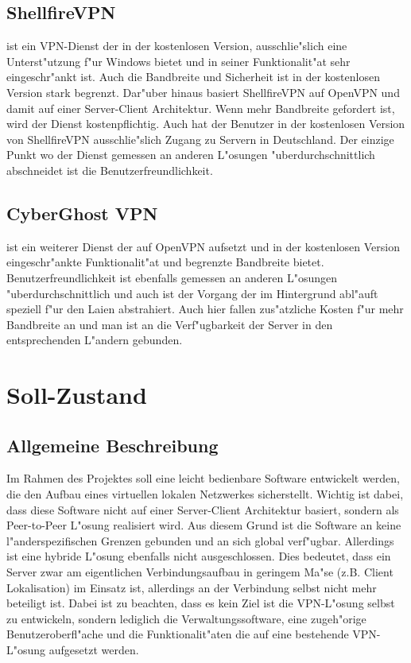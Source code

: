 \documentclass[a4paper,12pt]{scrreprt}
\begin{document}
	
	\subsection{ShellfireVPN} ist ein VPN-Dienst der in der kostenlosen Version, ausschlie"slich eine Unterst"utzung f"ur Windows bietet und in seiner Funktionalit"at sehr eingeschr"ankt ist. Auch die Bandbreite und Sicherheit ist in der kostenlosen Version stark begrenzt. Dar"uber hinaus basiert ShellfireVPN auf OpenVPN und damit auf einer Server-Client Architektur. Wenn mehr Bandbreite gefordert ist, wird der Dienst kostenpflichtig. Auch hat der Benutzer in der kostenlosen Version von ShellfireVPN ausschlie"slich Zugang zu Servern in Deutschland. Der einzige Punkt wo der Dienst gemessen an anderen L"osungen "uberdurchschnittlich abschneidet ist die Benutzerfreundlichkeit.
	
	\subsection{CyberGhost VPN} ist ein weiterer Dienst der auf OpenVPN aufsetzt und in der kostenlosen Version eingeschr"ankte Funktionalit"at und begrenzte Bandbreite bietet. Benutzerfreundlichkeit ist ebenfalls gemessen an anderen L"osungen "uberdurchschnittlich und auch ist der Vorgang der im Hintergrund abl"auft speziell f"ur den Laien abstrahiert. Auch hier fallen zus"atzliche Kosten f"ur mehr Bandbreite an und man ist an die Verf"ugbarkeit der Server in den entsprechenden L"andern gebunden. 
	
		
	\section{Soll-Zustand}
		
		\subsection{Allgemeine Beschreibung}
		
		Im Rahmen des Projektes soll eine leicht bedienbare Software entwickelt werden, die den Aufbau eines virtuellen lokalen Netzwerkes sicherstellt. Wichtig ist dabei, dass diese Software nicht auf einer Server-Client Architektur basiert, sondern als Peer-to-Peer L"osung realisiert wird. Aus diesem Grund ist die Software an keine l"anderspezifischen Grenzen gebunden und an sich global verf"ugbar. Allerdings ist eine hybride L"osung ebenfalls nicht ausgeschlossen. Dies bedeutet, dass ein Server zwar am eigentlichen Verbindungsaufbau in geringem Ma"se (z.B. Client Lokalisation) im Einsatz ist, allerdings an der Verbindung selbst nicht mehr beteiligt ist. Dabei ist zu beachten, dass es kein Ziel ist die VPN-L"osung selbst zu entwickeln, sondern lediglich die Verwaltungssoftware, eine zugeh"orige Benutzeroberfl"ache und die Funktionalit"aten die auf eine bestehende VPN-L"osung aufgesetzt werden.
		
\end{document}
